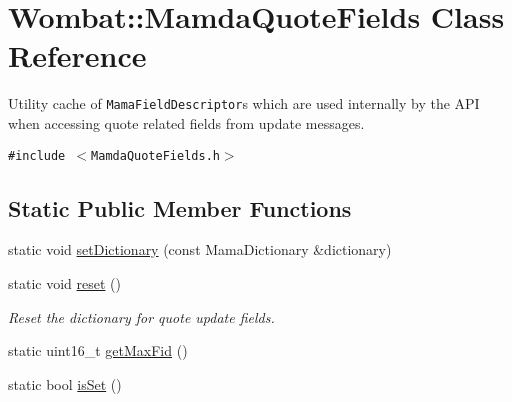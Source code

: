 \hypertarget{classWombat_1_1MamdaQuoteFields}{
\section{Wombat::Mamda\-Quote\-Fields Class Reference}
\label{classWombat_1_1MamdaQuoteFields}
}
Utility cache of {\tt Mama\-Field\-Descriptor}s which are used internally by the API when accessing quote related fields from update messages.  


{\tt \#include $<$Mamda\-Quote\-Fields.h$>$}

\subsection*{Static Public Member Functions}
\begin{CompactItemize}
\item 
static void \hyperlink{classWombat_1_1MamdaQuoteFields_b862fe0cd2d5874ef65f7f25703df471}{set\-Dictionary} (const Mama\-Dictionary \&dictionary)
\item 
static void \hyperlink{classWombat_1_1MamdaQuoteFields_199c60d1ed96f1126f0c4301a52d0528}{reset} ()
\begin{CompactList}\small\item\em Reset the dictionary for quote update fields. \item\end{CompactList}\item 
static uint16\_\-t \hyperlink{classWombat_1_1MamdaQuoteFields_50faf55120faf93f8be717adcd890006}{get\-Max\-Fid} ()
\item 
static bool \hyperlink{classWombat_1_1MamdaQuoteFields_94b81ab8ac496b14f092f0ff3aa2f693}{is\-Set} ()
\end{CompactItemize}
